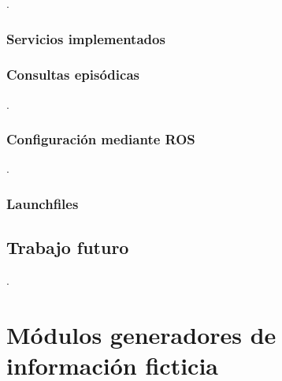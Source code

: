 .

\subsubsection{Servicios implementados}



\subsubsection{Consultas episódicas}

.

\subsubsection{Configuración mediante ROS}

.
\lstset{style=/Style/yaml/ROS}


\subsubsection{Launchfiles}



\subsection{Trabajo futuro}

.



\section{Módulos generadores de información ficticia}

